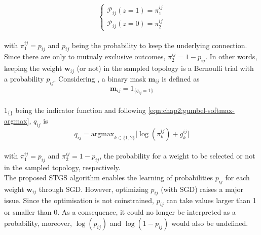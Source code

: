 \begin{equation}
    \left\{ \begin{array}{c}
    \mathcal{P}_{ij}(z=1)=\pi_1^{ij} \\ 
    \mathcal{P}_{ij}(z=0)=\pi_2^{ij}
    \end{array} \right.
\end{equation}\\

with $\pi_1^{ij}=p_{ij}$ and $p_{ij}$ being the probability to keep the
underlying connection. Since there are only to mutualy exclusive outcomes,
$\pi_2^{ij}=1-p_{ij}$. In other words, keeping the weight $\bm{w}_{ij}$ (or
not) in the sampled topology is a Bernoulli trial with a probability $p_{ij}$.
Considering , a binary mask  $\bm{m}_{ij}$
is defined as\\

\begin{equation}
  \label{eqn:chap2:mask_value}
  \bm{m}_{ij} = 1_{\{q_{ij}=1\}}
\end{equation}\\
 
$1_{\{\}}$ being the indicator function and following
\cref{eqn:chap2:gumbel-softmax-argmax}, $q_{ij}$ is\\

\begin{equation}
  \label{eqn:chap2:q_ij_expression}
  q_{ij} = {\text{argmax}_{k \in \{1,2\}}}\big[\log(\pi_k^{ij})+g_k^{ij}\big]
\end{equation}\\

with $\pi^{ij}_1 = p_{ij}$ and $\pi^{ij}_2 = 1-p_{ij}$, the probability for a
weight to be selected or not in the sampled topology, respectively.\\

The proposed \ac{STGS} algorithm enables the learning of probabilities
$p_{ij}$ for each weight $\bm{w}_{ij}$ through \ac{SGD}. However, optimizing
$p_{ij}$ (with \ac{SGD}) raises a major issue. Since the optimisation is not
coinstrained, $p_{ij}$ can take values  larger than 1 or smaller than 0. As a
consequence, it could no longer be interpreted as a probability, moreover,
$\log(p_{ij})$ and $\log(1-p_{ij})$ would also be undefined.\\

